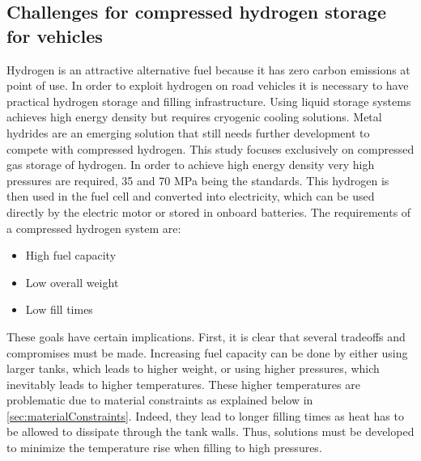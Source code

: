 


\subsection{Challenges for compressed hydrogen storage for vehicles}



Hydrogen is an attractive alternative fuel because it has zero carbon emissions at point of use. In order to exploit hydrogen on road vehicles it is necessary to have practical hydrogen storage and filling infrastructure.  Using liquid storage systems achieves high energy density but requires cryogenic cooling solutions. Metal hydrides are an emerging solution that still needs further development to compete with compressed hydrogen. This study focuses exclusively on compressed gas storage of hydrogen. In order to achieve high energy density very high pressures are required, 35 and 70 MPa being the standards. This hydrogen is then used in the fuel cell and converted into electricity, which can be used directly by the electric motor or stored in onboard batteries. The requirements of a compressed hydrogen system are: 


\begin{itemize}
\item High fuel capacity
\item Low overall weight
\item Low fill times
\end{itemize}

\noindent These goals have certain implications. First, it is clear that several tradeoffs and compromises must be made. Increasing fuel capacity can be done by either using larger tanks, which leads to higher weight, or using higher pressures, which inevitably leads to higher temperatures. These higher temperatures are problematic due to material constraints as explained below in \cref{sec:materialConstraints}. Indeed, they lead to longer filling times as heat has to be allowed to dissipate through the tank walls. Thus, solutions must be developed to minimize the temperature rise when filling to high pressures.

